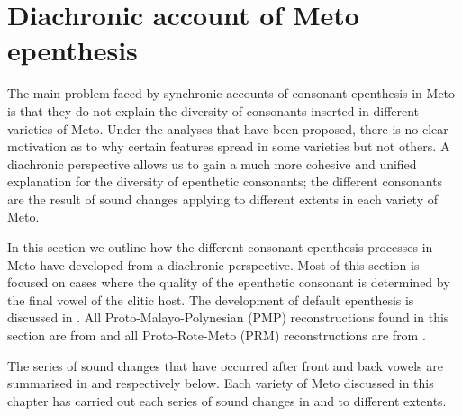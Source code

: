 \documentclass[output=paper]{langscibook}
\begin{document}
\section{Diachronic account of Meto epenthesis}\label{sec:DiacAcc}
The main problem faced by synchronic accounts of
consonant epenthesis in Meto is that they do not explain the diversity of consonants
inserted in different varieties of Meto.
Under the analyses that have been proposed, there is no clear motivation as to why certain
features spread in some varieties but not others. 
A diachronic perspective allows us to gain a much
more cohesive and unified explanation for the diversity
of epenthetic consonants; the different consonants
are the result of sound changes
applying to different extents in each variety of Meto.

In this section we outline how the different consonant epenthesis
processes in Meto have developed from a diachronic perspective.
Most of this section is focused on cases where the quality of 
the epenthetic consonant is determined by the final vowel of the clitic host.
The development of default epenthesis
is discussed in .
All Proto-Malayo-Polynesian (PMP) reconstructions found in this section
are from \citet{bltr} and all Proto-Rote-Meto (PRM) reconstructions
are from \citet{ed21-RMDict}.

The series of sound changes that
have occurred after front and back vowels
are summarised in  and  respectively below.
Each variety of Meto discussed in this chapter
has carried out each series of sound changes in  and 
to different extents. 

\begin{exe}
	\label{ex:EpeFroVow}
	\label{ex:EpeBacVow}
\end{exe}
\end{document}
